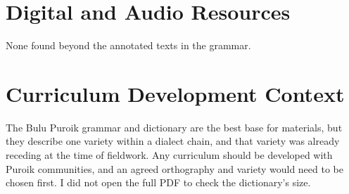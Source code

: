 \documentclass[12pt]{article}
\begin{document}
\section{Digital and Audio Resources}
None found beyond the annotated texts in the grammar.

\section{Curriculum Development Context}
The Bulu Puroik grammar and dictionary are the best base for materials, but they describe one variety within a dialect chain, and that variety was already receding at the time of fieldwork. Any curriculum should be developed with Puroik communities, and an agreed orthography and variety would need to be chosen first. I did not open the full PDF to check the dictionary's size.
\end{document}
